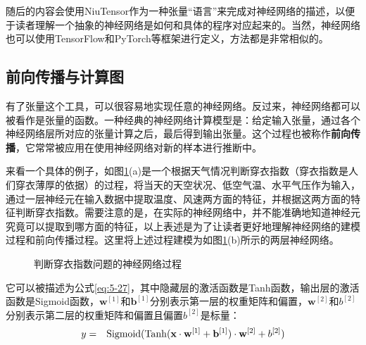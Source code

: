 \parinterval 随后的内容会使用NiuTensor作为一种张量``语言''来完成对神经网络的描述，以便于读者理解一个抽象的神经网络是如何和具体的程序对应起来的。当然，神经网络也可以使用TensorFlow和PyTorch等框架进行定义，方法都是非常相似的。


\subsection{前向传播与计算图}

\parinterval 有了张量这个工具，可以很容易地实现任意的神经网络。反过来，神经网络都可以被看作是张量的函数。一种经典的神经网络计算模型是：给定输入张量，通过各个神经网络层所对应的张量计算之后，最后得到输出张量。这个过程也被称作{\small\sffamily\bfseries{前向传播}}，它常常被应用在使用神经网络对新的样本进行推断中。

\parinterval 来看一个具体的例子，如图\ref{fig:5-37}(a)是一个根据天气情况判断穿衣指数（穿衣指数是人们穿衣薄厚的依据）的过程，将当天的天空状况、低空气温、水平气压作为输入，通过一层神经元在输入数据中提取温度、风速两方面的特征，并根据这两方面的特征判断穿衣指数。需要注意的是，在实际的神经网络中，并不能准确地知道神经元究竟可以提取到哪方面的特征，以上表述是为了让读者更好地理解神经网络的建模过程和前向传播过程。这里将上述过程建模为如图\ref{fig:5-37}(b)所示的两层神经网络。

\begin{figure}[htp]
\centering

\caption{判断穿衣指数问题的神经网络过程}
\label{fig:5-37}
\end{figure}

\parinterval 它可以被描述为公式\ref{eq:5-27}，其中隐藏层的激活函数是Tanh函数，输出层的激活函数是Sigmoid函数，$\mathbf w^{[1]}$和$\mathbf b^{[1]}$分别表示第一层的权重矩阵和偏置，$\mathbf w^{[2]}$和$b^{[2]}$分别表示第二层的权重矩阵和偏置且偏置$b^{[2]}$是标量：
\begin{eqnarray}
y&=&{\rm{Sigmoid}}({\rm{Tanh}}(\mathbf x\cdot \mathbf w^{[1]}+\mathbf b^{[1]})\cdot \mathbf w^{[2]}+ b^{[2]} )
\label{eq:5-27}
\end{eqnarray}

